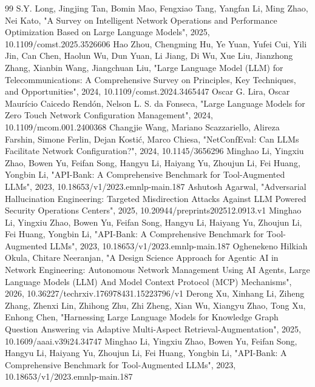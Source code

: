 \documentclass[conference]{IEEEtran}
\begin{document}
\begin{thebibliography}{99}
 S.Y. Long, Jingjing Tan, Bomin Mao, Fengxiao Tang, Yangfan Li, Ming Zhao, Nei Kato, "A Survey on Intelligent Network Operations and Performance Optimization Based on Large Language Models", 2025, 10.1109/comst.2025.3526606
 Hao Zhou, Chengming Hu, Ye Yuan, Yufei Cui, Yili Jin, Can Chen, Haolun Wu, Dun Yuan, Li Jiang, Di Wu, Xue Liu, Jianzhong Zhang, Xianbin Wang, Jiangchuan Liu, "Large Language Model (LLM) for Telecommunications: A Comprehensive Survey on Principles, Key Techniques, and Opportunities", 2024, 10.1109/comst.2024.3465447
 Oscar G. Lira, Oscar Maurício Caicedo Rendón, Nelson L. S. da Fonseca, "Large Language Models for Zero Touch Network Configuration Management", 2024, 10.1109/mcom.001.2400368
 Changjie Wang, Mariano Scazzariello, Alireza Farshin, Simone Ferlin, Dejan Kostić, Marco Chiesa, "NetConfEval: Can LLMs Facilitate Network Configuration?", 2024, 10.1145/3656296
 Minghao Li, Yingxiu Zhao, Bowen Yu, Feifan Song, Hangyu Li, Haiyang Yu, Zhoujun Li, Fei Huang, Yongbin Li, "API-Bank: A Comprehensive Benchmark for Tool-Augmented LLMs", 2023, 10.18653/v1/2023.emnlp-main.187
 Ashutosh Agarwal, "Adversarial Hallucination Engineering: Targeted Misdirection Attacks Against LLM Powered Security Operations Centers", 2025, 10.20944/preprints202512.0913.v1
 Minghao Li, Yingxiu Zhao, Bowen Yu, Feifan Song, Hangyu Li, Haiyang Yu, Zhoujun Li, Fei Huang, Yongbin Li, "API-Bank: A Comprehensive Benchmark for Tool-Augmented LLMs", 2023, 10.18653/v1/2023.emnlp-main.187
 Oghenekeno Hilkiah Okula, Chitare Neeranjan, "A Design Science Approach for Agentic AI in Network Engineering: Autonomous Network Management Using AI Agents, Large Language Models (LLM) And Model Context Protocol (MCP) Mechanisms", 2026, 10.36227/techrxiv.176978431.15223796/v1
 Derong Xu, Xinhang Li, Ziheng Zhang, Zhenxi Lin, Zhihong Zhu, Zhi Zheng, Xian Wu, Xiangyu Zhao, Tong Xu, Enhong Chen, "Harnessing Large Language Models for Knowledge Graph Question Answering via Adaptive Multi-Aspect Retrieval-Augmentation", 2025, 10.1609/aaai.v39i24.34747
 Minghao Li, Yingxiu Zhao, Bowen Yu, Feifan Song, Hangyu Li, Haiyang Yu, Zhoujun Li, Fei Huang, Yongbin Li, "API-Bank: A Comprehensive Benchmark for Tool-Augmented LLMs", 2023, 10.18653/v1/2023.emnlp-main.187
\end{thebibliography}
\end{document}
